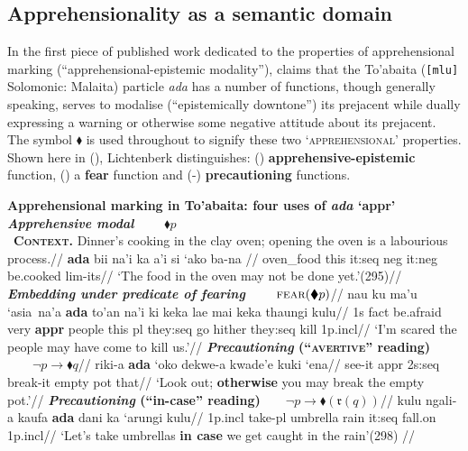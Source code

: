\subsection{Apprehensionality as a semantic domain}\label{typ.appr}

In the first piece of published work dedicated to the properties of apprehensional marking (``apprehensional-epistemic modality''), \citet{Lichtenberk1995} claims that the To'abaita ({\tt[mlu]} Solomonic: Malaita) particle \textit{ada} has a number of functions, though generally speaking, serves to modalise (``epistemically downtone'') its prejacent while dually expressing a warning or otherwise some negative attitude about its prejacent. The symbol $ \blacklozenge $ is used throughout to signify these two `\textsc{apprehensional}' properties. Shown here in (), Lichtenberk distinguishes: () \textbf{apprehensive-epistemic} function, () a \textbf{fear} function and (-) \textbf{precautioning} functions.

	\pex \textbf{Apprehensional marking in To'abaita: four uses of \textit{ada} `\gls{appr}'}
	\a{}%
	\begingl %
	\glpreamble \textbf{\textit{Apprehensive modal $\qquad \blacklozenge p $}}\\\ \textbf{\textsc{Context}.} Dinner's cooking in the clay oven; opening the oven is a labourious process.//
	\gla \textbf{ada} bii na'i ka a'i si `ako ba-na // 
	\glb {} oven\_food this it:{\sc seq} {\sc neg} it{\sc:neg} be.cooked {\sc lim-}its//
	\glft `The food in the oven may not be done yet.'\hfill(295)//%
	\endgl %
	\a{}\begingl
	\glpreamble \textbf{\textit{Embedding under predicate of fearing $ \qquad \textsc{fear}(\blacklozenge p) $}}//
	\gla nau ku ma'u `asia~na'a \textbf{ada} to'an na'i ki keka lae mai keka thaungi kulu//
	\glb 1s \gls{fact} be.afraid very \textbf{\gls{appr}} people this \gls{pl} they:\gls{seq} go hither they:\gls{seq} kill 1p.\gls{incl}//
	\glft`I'm scared the people may have come to kill us.'//
	\endgl
	\a{}\begingl\glpreamble\textbf{\textit{Precautioning} (``\textsc{avertive}'' reading)}$ \qquad \neg p\to\blacklozenge q $//
	\gla riki-a \textbf{ada} `oko dekwe-a kwade'e kuki `ena//
	\glb see-it \gls{appr} 2s:\gls{seq} break-it empty pot that//
	\glft`Look out; \textbf{otherwise} you may break the empty pot.'//\endgl
	\a{}\begingl\glpreamble \textbf{\textit{Precautioning} (``in-case'' reading)}$ \qquad \neg p\to\blacklozenge(\mathfrak{r}(q)) $//
	\gla kulu ngali-a kaufa \textbf{ada} dani ka `arungi kulu//
	\glb 1p{\sc.incl} take{\sc-pl} umbrella  rain it:{\sc seq} fall.on 1p{\sc.incl}//
	\glft `Let's take umbrellas \textbf{in case} we get caught in the rain'\hfill(298) //\endgl
	\xe


